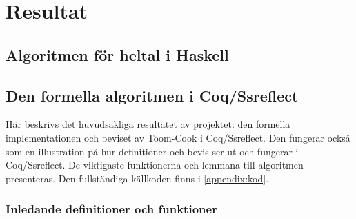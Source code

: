 
\DeclareMathOperator*{\toom}{Toom-Cook-\textit{m}\;}












\setcounter{page}{1}            %

\setcounter{secnumdepth}{3}    %

\section{Resultat}
\subsection{Algoritmen för heltal i Haskell}

\subsection{Den formella algoritmen i Coq/Ssreflect}
\label{section:formalg}
Här beskrivs det huvudsakliga resultatet av projektet: den formella implementationen och beviset av Toom-Cook
i Coq/Ssreflect. 
Den fungerar också som en illustration på hur 
definitioner och bevis ser ut och fungerar i Coq/Ssreflect. De viktigaste funktionerna och lemmana till algoritmen
presenteras. Den fullständiga källkoden finns i \ref{appendix:kod}.
\subsubsection{Inledande definitioner och funktioner}
\label{section:forminl}
